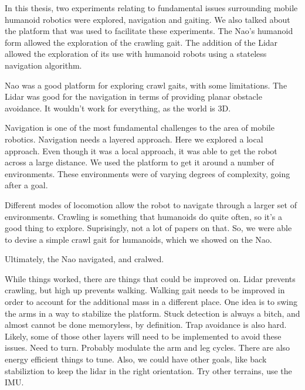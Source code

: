 In this thesis, two experiments relating to fundamental issues surrounding
mobile humanoid robotics were explored, navigation and gaiting.
We also talked about the platform that was used to facilitate these
experiments. The Nao's humanoid form allowed the exploration of the
crawling gait. The addition of the Lidar allowed the exploration of its use
with humanoid robots using a stateless navigation algorithm.

Nao was a good platform for exploring crawl gaits, with some limitations.
The Lidar was good for the navigation in terms of providing planar obstacle
avoidance. It wouldn't work for everything, as the world is 3D.

Navigation is one of the most fundamental challenges to the area of mobile 
robotics. Navigation needs a layered approach. Here we explored a local
approach. Even though it was a local approach, it was able to get the robot
across a large distance.
We used the platform to get it around a number of environments.
These environments were of varying degrees of complexity, going after a goal.

Different modes of locomotion allow the robot to navigate through a larger set
of environments. Crawling is something that humanoids do quite often, so it's
a good thing to explore. Suprisingly, not a lot of papers on that.
So, we were able to devise a simple crawl gait for humanoids, which we showed
on the Nao.

Ultimately, the Nao navigated, and cralwed.

While things worked, there are things that could be improved on.
Lidar prevents crawling, but high up prevents walking.
Walking gait needs to be improved in order to account for the additional mass
in a different place. One idea is to swing the arms in a way to stabilize
the platform.
Stuck detection is always a bitch, and almost cannot be done memoryless,
by definition. Trap avoidance is also hard. Likely, some of those other layers
will need to be implemented to avoid these issues.
Need to turn. Probably modulate the arm and leg cycles.
There are also energy efficient things to tune.
Also, we could have other goals, like back stabiliztion to keep the lidar
in the right orientation.
Try other terrains, use the IMU.
